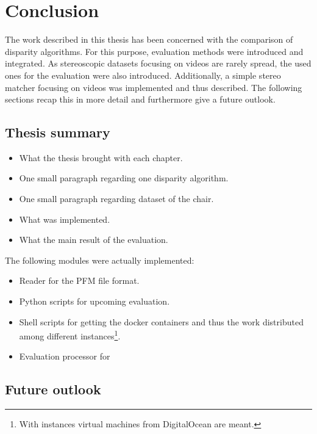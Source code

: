 \chapter{Conclusion}
\label{chap:conclusion}

The work described in this thesis has been concerned with the comparison of disparity algorithms.
For this purpose, evaluation methods were introduced and integrated.
As stereoscopic datasets focusing on videos are rarely spread, the used ones for the evaluation were also introduced.
Additionally, a simple stereo matcher focusing on videos was implemented and thus described.
The following sections recap this in more detail and furthermore give a future outlook.

\section{Thesis summary}

\begin{itemize}
  \item What the thesis brought with each chapter.
  \item One small paragraph regarding one disparity algorithm.
  \item One small paragraph regarding dataset of the chair.
  \item What was implemented.
  \item What the main result of the evaluation.
\end{itemize}


The following modules were actually implemented:

\begin{itemize}
  \item Reader for the PFM file format.
  \item Python scripts for upcoming evaluation.
  \item Shell scripts for getting the docker containers and thus the work distributed among different instances\footnote{With instances virtual machines from DigitalOcean are meant.}.
  \item Evaluation processor for
\end{itemize}


\section{Future outlook}

